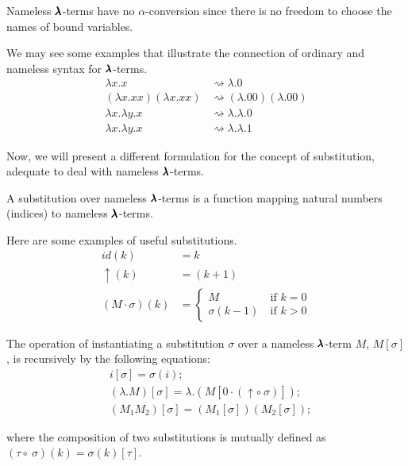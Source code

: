 \begin{remark}
  Nameless $\pmb{\lambda}$-terms have no $\alpha$-conversion since there is no freedom to choose the names of bound variables.
\end{remark}

We may see some examples that illustrate the connection of ordinary and nameless syntax for $\pmb{\lambda}$-terms.
\begin{align*}
  \lambda x . x &\rightsquigarrow \lambda . 0 \\
  (\lambda x . xx)(\lambda x . xx) &\rightsquigarrow (\lambda . 00)(\lambda .00) \\
  \lambda x . \lambda y . x &\rightsquigarrow \lambda . \lambda . 0 \\
  \lambda x . \lambda y . x &\rightsquigarrow \lambda . \lambda . 1
\end{align*}

Now, we will present a different formulation for the concept of substitution, adequate to deal with nameless $\pmb{\lambda}$-terms.

\begin{definition}[Substitution]
  A substitution over nameless $\pmb{\lambda}$-terms is a function mapping natural numbers (indices) to nameless $\pmb{\lambda}$-terms.
\end{definition}

Here are some examples of useful substitutions.
\begin{align*}
  id(k) &= k \\
  \uparrow(k) &= (k+1) \\
  (M \cdot \sigma)(k) &=
                        \begin{cases}
                          M & \ \text{if $k = 0$} \\
                          \sigma(k-1) & \ \text{if $k > 0$}
                        \end{cases}
\end{align*}

\begin{definition}
  The operation of instantiating a substitution $\sigma$ over a nameless $\pmb{\lambda}$-term $M$, $M[\sigma]$, is recursively by the following equations:
  \begin{align*}
    & i[\sigma] = \sigma(i); \\
    & (\lambda . M)[\sigma] = \lambda . (M[0 \cdot (\uparrow \circ \ \sigma)]); \\
    & (M_1 M_2)[\sigma] = (M_1[\sigma]) (M_2[\sigma]);
  \end{align*}

  where the composition of two substitutions is mutually defined as $(\tau \circ \ \sigma)(k) = \sigma(k)[\tau]$.
\end{definition}

